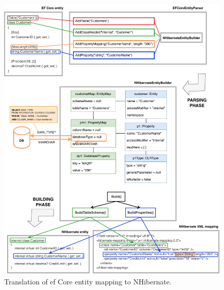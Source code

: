 \begin{figure}[!htp]
  \centering
  \includegraphics[width=\textwidth]{thesis/img/thesis/03_parsing_building.drawio.pdf}
  \caption{Translation of \acrshort{ef} Core entity mapping to NHibernate.}
  \label{fig:translation_complete}
\end{figure}

